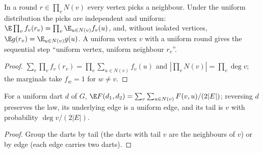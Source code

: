 \begin{lemma}\label{lem:neighborround}
\leanok
{}
In a round $r\in\prod_vN(v)$ every vertex picks a neighbour. Under the uniform
distribution the picks are independent and uniform:
$\E\prod_vf_v(r_v)=\prod_v\E_{u\in N(v)}f_v(u)$, and, without isolated
vertices, $\E g(r_v)=\E_{u\in N(v)}g(u)$. A uniform vertex $v$ with a uniform
round gives the sequential step ``uniform vertex, uniform neighbour $r_v$''.
\end{lemma}
\begin{proof}\leanok
$\sum_r\prod_vf_v(r_v)=\prod_v\sum_{u\in N(v)}f_v(u)$ and
$|\prod_vN(v)|=\prod_v\deg v$; the marginals take $f_w=1$ for $w\ne v$.
\end{proof}
\begin{lemma}\label{lem:edgeround}
\leanok
{}
For a uniform dart $d$ of $G$,
$\E F(d_1,d_2)=\sum_v\sum_{u\in N(v)}F(v,u)/(2|E|)$; reversing $d$ preserves
the law, its underlying edge is a uniform edge, and its tail is $v$ with
probability $\deg v/(2|E|)$.
\end{lemma}
\begin{proof}\leanok
Group the darts by tail (the darts with tail $v$ are the neighbours of $v$)
or by edge (each edge carries two darts).
\end{proof}
